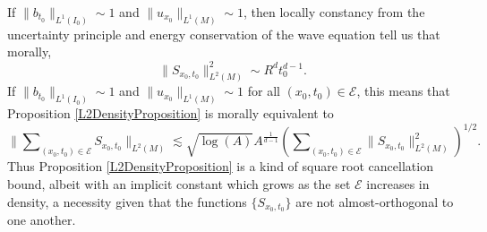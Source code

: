 \begin{remark}
    If $\| b_{t_0} \|_{L^1(I_0)} \sim 1$ and $\| u_{x_0} \|_{L^1(M)} \sim 1$, then locally constancy from the uncertainty principle and energy conservation of the wave equation tell us that morally,
    \begin{equation}
        \| S_{x_0,t_0} \|_{L^2(M)}^2 \sim R^d t_0^{d-1}.
    \end{equation}
    If $\| b_{t_0} \|_{L^1(I_0)} \sim 1$ and $\| u_{x_0} \|_{L^1(M)} \sim 1$ for all $(x_0,t_0) \in \mathcal{E}$, this means that Proposition \ref{L2DensityProposition} is morally equivalent to
    \begin{equation}
        \Big\| \sum\nolimits_{(x_0,t_0) \in \mathcal{E}} {S\!}_{x_0,t_0} \Big\|_{L^2(M)} \lesssim \sqrt{\log(A)} A^{\frac{1}{d-1}} \left( \sum\nolimits_{(x_0,t_0) \in \mathcal{E}} \| {S\!}_{x_0,t_0} \|_{L^2(M)}^2 \right)^{1/2}.
    \end{equation}
    Thus Proposition \ref{L2DensityProposition} is a kind of square root cancellation bound, albeit with an implicit constant which grows as the set $\mathcal{E}$ increases in density, a necessity given that the functions $\{ {S\!}_{x_0,t_0} \}$ are not almost-orthogonal to one another.
\end{remark}

